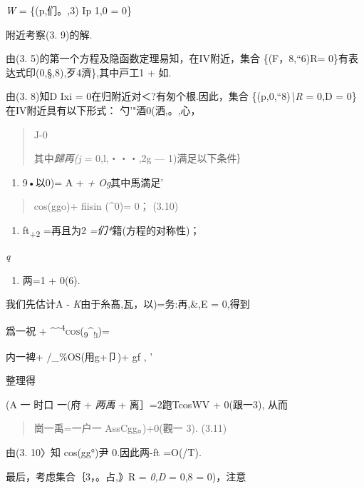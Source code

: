 \documentclass{article}
\begin{document}
\emph{W} = \{(p,们。,3) Ip 1,0 = 0\}

附近考察(3. 9)的解.

由(3. 5)的第一个方程及隐函数定理易知，在IV附近，集合
\{(F，8,``6)\textbar{}R= 0\}有表达式印(0,§,8),歹4濟\},其中戸工1 + 如.

由(3. 8)知D Ixi = 0在归附近对＜?有匆个根.因此，集合
\{(p,0,``8)\emph{\textbackslash{}R} = 0,D = 0\}在IV附近具有以下形式：
勺'"酒0(洒,。,心，

\begin{quote}
J-0

其中\emph{歸再(j} = 0,l,・・・,2g --- 1)满足以下条件｝
\end{quote}

\begin{enumerate}
\def\labelenumi{(\arabic{enumi})}
\item
  9•以0)= A + \emph{+ Og}其中馬満足'
\end{enumerate}

\begin{quote}
cos(ggo)+ fiisin (\^{}0)= 0； (3.10)
\end{quote}

\begin{enumerate}
\def\labelenumi{(\arabic{enumi})}
\setcounter{enumi}{1}
\item
  ft\textsubscript{+2} =再且为2 \emph{=们*}籍(方程的对称性)；
\end{enumerate}

\emph{q}

\begin{enumerate}
\def\labelenumi{(\arabic{enumi})}
\setcounter{enumi}{2}
\item
  两=1 + 0(6).
\end{enumerate}

我们先估计A - \emph{K}由于糸髙,瓦，以)=务:再,\&,E = 0,得到

爲一祝 +
\textsc{\^{}\^{}\textsuperscript{4}cos(\textsubscript{9}\^{}\textsubscript{!i})=}

内一裨+ /\_\%OS(用g+卩)+ gf , '

整理得

(A 一 时口 一(府 + \emph{两禹} + 离］=2跑TcosWV + 0(跟一3), 从而

\begin{quote}
崗一禹=一户一 AssCgg。)+0(觀一 3). (3.11)
\end{quote}

由(3. 10〉知 cos(gg°)尹 0.因此两-ft =O(/T).

最后，考虑集合｛3，。占,》\textbar{}R = \emph{0,D} = 0,8 = 0)，注意
\end{document}
